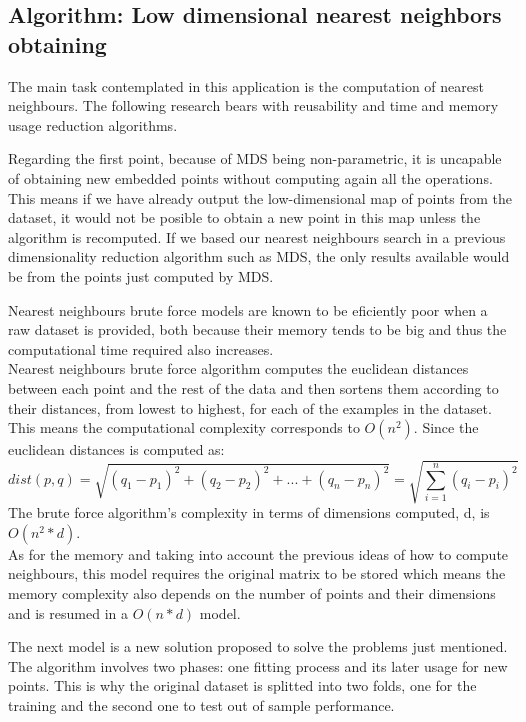 \documentclass[a4paper,11pt,spanish]{report}
\begin{document}
\subsection{Algorithm: Low dimensional nearest neighbors obtaining}
\label{ssec:nneigh}

The main task contemplated in this application is the computation of nearest neighbours. The following research bears with reusability and time and memory usage reduction algorithms.

Regarding the first point, because of MDS being non-parametric, it is uncapable of obtaining new embedded points without computing again all the operations. This means if we have already output the low-dimensional map of points from the dataset, it would not be posible to obtain a new point in this map unless the algorithm is recomputed. If we based our nearest neighbours search in a previous dimensionality reduction algorithm such as MDS, the only results available would be from the points just computed by MDS.

Nearest neighbours brute force models \citep{brute} are known to be eficiently poor when a raw dataset is provided, both because their memory tends to be big and thus the computational time required also increases.\\
Nearest neighbours brute force algorithm computes the euclidean distances between each point and the rest of the data and then sortens them according to their distances, from lowest to highest, for each of the examples in the dataset. This means the computational complexity corresponds to $O(n^{2})$. Since the euclidean distances is computed as:
$$ dist(p,q) = \sqrt{(q_{1}-p_{1})^{2}+(q_{2}-p_{2})^{2}+ ... + (q_{n}-p_{n})^{2}} = \sqrt{\sum_{i=1}^{n} (q_{i}-p_{i})^{2}}$$
The brute force algorithm's complexity in terms of dimensions computed, d, is $O(n^{2}*d)$.\\
As for the memory and taking into account the previous ideas of how to compute neighbours, this model requires the original matrix to be stored which means the memory complexity also depends on the number of points and their dimensions and is resumed in a $O(n*d)$ model.

The next model is a new solution proposed to solve the problems just mentioned.\\
The algorithm involves two phases: one fitting process and its later usage for new points. This is why the original dataset is splitted into two folds, one for the training and the second one to test out of sample performance.
\end{document}
